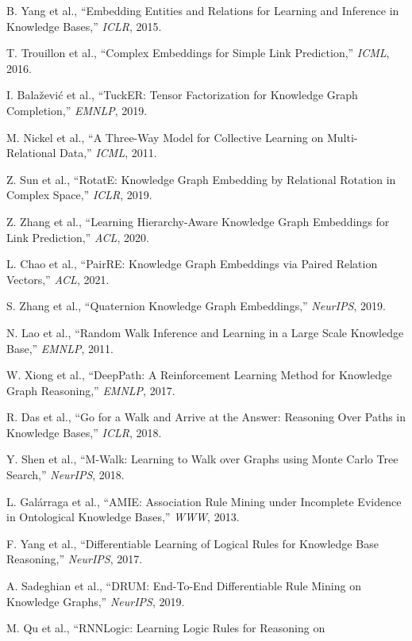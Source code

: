 \documentclass[12pt,a4paper]{article}
\begin{document}
\begin{enumerate}[leftmargin=1.5em, label={[\arabic*]}]
  \item B. Yang et al., ``Embedding Entities and Relations for Learning and
        Inference in Knowledge Bases,'' \textit{ICLR}, 2015.
  \item T. Trouillon et al., ``Complex Embeddings for Simple Link Prediction,''
        \textit{ICML}, 2016.
  \item I. Bala\v{z}evi\'{c} et al., ``TuckER: Tensor Factorization for
        Knowledge Graph Completion,'' \textit{EMNLP}, 2019.
  \item M. Nickel et al., ``A Three-Way Model for Collective Learning on
        Multi-Relational Data,'' \textit{ICML}, 2011.
  \item Z. Sun et al., ``RotatE: Knowledge Graph Embedding by Relational
        Rotation in Complex Space,'' \textit{ICLR}, 2019.
  \item Z. Zhang et al., ``Learning Hierarchy-Aware Knowledge Graph Embeddings
        for Link Prediction,'' \textit{ACL}, 2020.
  \item L. Chao et al., ``PairRE: Knowledge Graph Embeddings via Paired
        Relation Vectors,'' \textit{ACL}, 2021.
  \item S. Zhang et al., ``Quaternion Knowledge Graph Embeddings,''
        \textit{NeurIPS}, 2019.
  \item N. Lao et al., ``Random Walk Inference and Learning in a Large Scale
        Knowledge Base,'' \textit{EMNLP}, 2011.
  \item W. Xiong et al., ``DeepPath: A Reinforcement Learning Method for
        Knowledge Graph Reasoning,'' \textit{EMNLP}, 2017.
  \item R. Das et al., ``Go for a Walk and Arrive at the Answer: Reasoning
        Over Paths in Knowledge Bases,'' \textit{ICLR}, 2018.
  \item Y. Shen et al., ``M-Walk: Learning to Walk over Graphs using Monte
        Carlo Tree Search,'' \textit{NeurIPS}, 2018.
  \item L. Gal\'{a}rraga et al., ``AMIE: Association Rule Mining under
        Incomplete Evidence in Ontological Knowledge Bases,'' \textit{WWW},
        2013.
  \item F. Yang et al., ``Differentiable Learning of Logical Rules for
        Knowledge Base Reasoning,'' \textit{NeurIPS}, 2017.
  \item A. Sadeghian et al., ``DRUM: End-To-End Differentiable Rule Mining
        on Knowledge Graphs,'' \textit{NeurIPS}, 2019.
  \item M. Qu et al., ``RNNLogic: Learning Logic Rules for Reasoning on

\end{enumerate}
\end{document}
